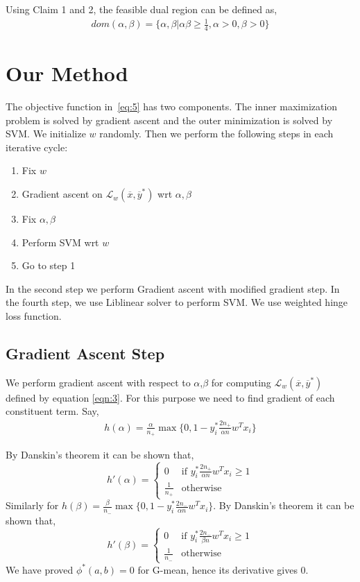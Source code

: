 \documentclass{article} %
\begin{document}
Using Claim 1 and 2, the feasible dual region can be defined as,
\begin{align*}
dom(\alpha,\beta) = \{\alpha,\beta|\alpha\beta \geq \frac{1}{4},\alpha > 0,\beta > 0\}
\end{align*}

\section{Our Method}
The objective function in~\ref{eq:5} has two components. The inner maximization problem is solved by gradient ascent and the outer minimization is solved by SVM. We initialize $w$ randomly. Then we perform the following steps in each iterative cycle:
\begin{enumerate}
	\item Fix $w$
	\item Gradient ascent on $\mathcal L_w(\overline{x},\overline{y}^*)$ wrt $\alpha,\beta$
	\item Fix $\alpha,\beta$
	\item Perform SVM wrt $w$
	\item Go to step 1
\end{enumerate}
In the second step we perform Gradient ascent with modified gradient step. In the fourth step, we use Liblinear solver to perform SVM. We use weighted hinge loss function.
\subsection{Gradient Ascent Step}
We perform gradient ascent with respect to $\alpha$,$\beta$ for computing $\mathcal L_w(\overline{x},\overline{y}^*)$ defined by equation \ref{eqn:3}. For this purpose we need to find gradient of each constituent term. Say,
\begin{align*}
h(\alpha) = \frac{\alpha}{n_+}\max\{0,1-y_i^*\frac{2n_+}{\alpha n}w^Tx_i\}
\end{align*}

By Danskin's theorem it can be shown that,
\[
h'(\alpha)=
\begin{cases}
0 &\text{if }y_i^*\frac{2n_+}{\alpha n}w^Tx_i \geq 1\\
\frac{1}{n_+} &\text{otherwise}
\end{cases}
\]
Similarly for $h(\beta) = \frac{\beta}{n_-}\max\{0,1-y_i^*\frac{2n_-}{\alpha n}w^Tx_i\}$. 
By Danskin's theorem it can be shown that,
\[
h'(\beta)=
\begin{cases}
0 &\text{if }y_i^*\frac{2n_-}{\beta n}w^Tx_i \geq 1\\
\frac{1}{n_-} &\text{otherwise}
\end{cases}
\]
We have proved $\phi^*(a,b)=0$ for G-mean, hence its derivative gives 0.
\end{document}
